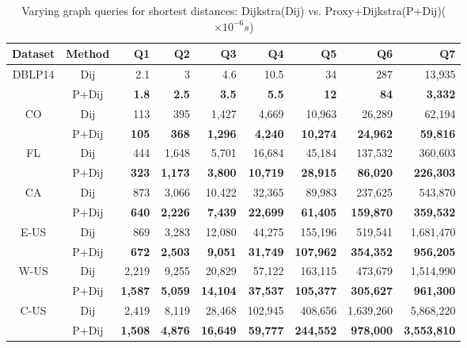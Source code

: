 \begin{table}[t!]
\label{tab:performance_dist_queries_dj}
\caption{Varying graph queries  for shortest distances: Dijkstra(Dij) vs. Proxy+Dijkstra(P+Dij)($\times 10^{-6}s$)}
\vspace{-1ex}
\begin{center}
\begin{tabular}{|c|c|r|r|r|r|r|r|r|}
\hline

Dataset & Method & Q1 & Q2 & Q3 & Q4 & Q5 & Q6 &Q7  \\ \hline \hline

 \multirow{2}{*}{DBLP14} & Dij & 2.1          & 3   & 4.6 & 10.5 & 34 & 287 & 13,935 \\ \cline{2-9}
                       & P+Dij & {\bf1.8} & {\bf2.5} & {\bf3.5} & {\bf5.5} & {\bf12} & {\bf84} & {\bf3,332} \\ \hline
 \multirow{2}{*}{CO}     & Dij & 113 & 395 & 1,427 & 4,669 & 10,963 & 26,289 & 62,194 \\ \cline{2-9}
                       & P+Dij & {\bf105} & {\bf368} & {\bf1,296} & {\bf4,240} & {\bf10,274} & {\bf24,962} & {\bf59,816} \\ \hline
 \multirow{2}{*}{FL}     & Dij & 444 & 1,648 & 5,701 & 16,684 & 45,184 & 137,532 & 360,603 \\ \cline{2-9}
                       & P+Dij & {\bf323} & {\bf1,173} & {\bf3,800} & {\bf10,719} & {\bf28,915} & {\bf86,020}  & {\bf226,303} \\ \hline
 \multirow{2}{*}{CA}     & Dij & 873 & 3,066 & 10,422 & 32,365 & 89,983 & 237,625 & 543,870 \\ \cline{2-9}
                       & P+Dij & {\bf640} & {\bf2,226} & {\bf7,439}  & {\bf22,699} & {\bf61,405} & {\bf159,870} & {\bf359,532} \\ \hline
 \multirow{2}{*}{E-US}   & Dij & 869 & 3,283 & 12,080 & 44,275 & 155,196 & 519,541 & 1,681,470 \\ \cline{2-9}
                       & P+Dij & {\bf672} & {\bf2,503} & {\bf9,051}  & {\bf31,749} & {\bf107,962} & {\bf354,352} & {\bf956,205} \\ \hline
 \multirow{2}{*}{W-US}   & Dij & 2,219 & 9,255 & 20,829 & 57,122 & 163,115 & 473,679 & 1,514,990 \\ \cline{2-9}
                       & P+Dij & {\bf1,587} & {\bf5,059} & {\bf14,104} & {\bf37,537} & {\bf105,377} & {\bf305,627} & {\bf961,300} \\ \hline
 \multirow{2}{*}{C-US}   & Dij & 2,419 & 8,119 & 28,468 & 102,945 & 408,656 & 1,639,260 & 5,868,220 \\ \cline{2-9}
                       & P+Dij & {\bf1,508} & {\bf4,876} & {\bf16,649} & {\bf59,777} & {\bf244,552} & {\bf978,000} & {\bf3,553,810} \\ \hline
\end{tabular}
\end{center}
\end{table}

